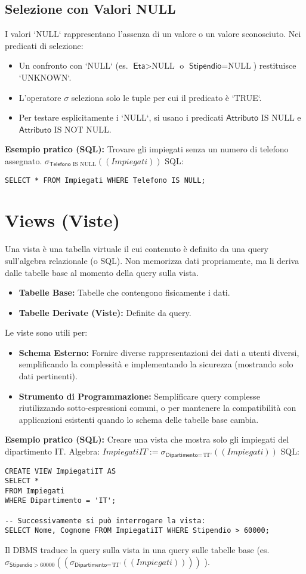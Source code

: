 \documentclass{article}
\newcommand{\Rel}[1]{\textit{#1}} %
\newcommand{\Attr}[1]{\textsf{#1}} %
\newcommand{\myselectop}[2]{\sigma_{#1}(#2)}
\begin{document}
	\subsection{Selezione con Valori NULL}
	I valori `NULL` rappresentano l'assenza di un valore o un valore sconosciuto.
	Nei predicati di selezione:
	\begin{itemize}
		\item Un confronto con `NULL` (es. $\Attr{Eta} > \text{NULL}$ o $\Attr{Stipendio} = \text{NULL}$) restituisce `UNKNOWN`.
		\item L'operatore $\sigma$ seleziona solo le tuple per cui il predicato è `TRUE`.
		\item Per testare esplicitamente i `NULL`, si usano i predicati $\Attr{Attributo} \text{ IS NULL}$ e $\Attr{Attributo} \text{ IS NOT NULL}$.
	\end{itemize}
	\textbf{Esempio pratico (SQL):} Trovare gli impiegati senza un numero di telefono assegnato.
	$\myselectop{\Attr{Telefono} \text{ IS NULL}}{(\Rel{Impiegati})}$
	SQL:
	\begin{verbatim}
SELECT * FROM Impiegati WHERE Telefono IS NULL;
	\end{verbatim}
	
	\section{Views (Viste)}
	Una vista è una tabella virtuale il cui contenuto è definito da una query sull'algebra relazionale (o SQL). Non memorizza dati propriamente, ma li deriva dalle tabelle base al momento della query sulla vista.
	\begin{itemize}
		\item \textbf{Tabelle Base:} Tabelle che contengono fisicamente i dati.
		\item \textbf{Tabelle Derivate (Viste):} Definite da query.
	\end{itemize}
	Le viste sono utili per:
	\begin{itemize}
		\item \textbf{Schema Esterno:} Fornire diverse rappresentazioni dei dati a utenti diversi, semplificando la complessità e implementando la sicurezza (mostrando solo dati pertinenti).
		\item \textbf{Strumento di Programmazione:} Semplificare query complesse riutilizzando sotto-espressioni comuni, o per mantenere la compatibilità con applicazioni esistenti quando lo schema delle tabelle base cambia.
	\end{itemize}
	\textbf{Esempio pratico (SQL):} Creare una vista che mostra solo gli impiegati del dipartimento IT.
	Algebra: $\Rel{ImpiegatiIT} := \myselectop{\Attr{Dipartimento} = \text{'IT'}}{(\Rel{Impiegati})}$
	SQL:
	\begin{verbatim}
CREATE VIEW ImpiegatiIT AS
SELECT *
FROM Impiegati
WHERE Dipartimento = 'IT';

-- Successivamente si può interrogare la vista:
SELECT Nome, Cognome FROM ImpiegatiIT WHERE Stipendio > 60000;
	\end{verbatim}
	Il DBMS traduce la query sulla vista in una query sulle tabelle base (es. $\myselectop{\Attr{Stipendio} > 60000}{(\myselectop{\Attr{Dipartimento} = \text{'IT'}}{(\Rel{Impiegati})})}$ ).
	
\end{document}
